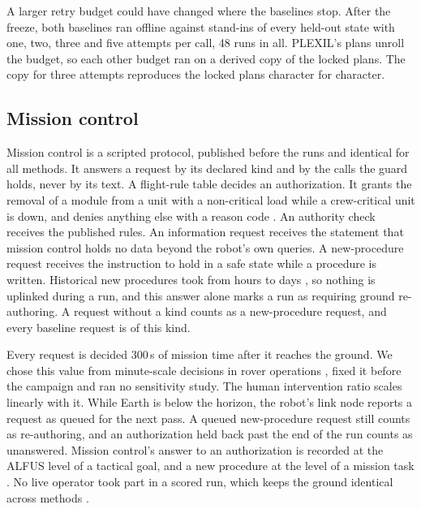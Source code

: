 A larger retry budget could have changed where the baselines stop. After the freeze, both baselines ran offline against
stand-ins of every held-out state with one, two, three and five attempts per call, 48 runs in all. PLEXIL's plans unroll
the budget, so each other budget ran on a derived copy of the locked plans. The copy for three attempts reproduces the
locked plans character for character.

\subsection{Mission control}
\label{sec:setup-operator}

Mission control is a scripted protocol, published before the runs and identical for all methods. It answers a request
by its declared kind and by the calls the guard holds, never by its text. A flight-rule table decides an authorization.
It grants the removal of a module from a unit with a non-critical load while a crew-critical unit is down, and denies
anything else with a reason code \citep{cfr1214403}. An authority check receives the published rules. An information
request receives the statement that mission control holds no data beyond the robot's own queries. A new-procedure
request receives the instruction to hold in a safe state while a procedure is written. Historical new procedures took
from hours to days \citep{nasa2019mbsu3}, so nothing is uplinked during a run, and this answer alone marks a run as
requiring ground re-authoring. A request without a kind counts as a new-procedure request, and every baseline request
is of this kind.

Every request is decided 300\,s of mission time after it reaches the ground. We chose this value from minute-scale
decisions in rover operations \citep{lim2024viper}, fixed it before the campaign and ran no sensitivity study. The human
intervention ratio scales linearly with it. While Earth is below the horizon, the robot's link node reports a request as
queued for the next pass. A queued new-procedure request still counts as re-authoring, and an authorization held back
past the end of the run counts as unanswered. Mission control's answer to an authorization is recorded at the ALFUS level
of a tactical goal, and a new procedure at the level of a mission task \citep{huang2007alfus}. No live operator took part
in a scored run, which keeps the ground identical across methods \citep{riek2012woz}.

